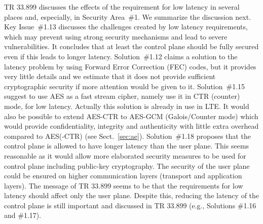 \documentclass[12pt]{llncs}
\begin{document}
TR 33.899 discusses the effects of the requirement for low latency in several places and, especially, in Security Area~\#1. We summarize the discussion next. 
Key Issue~\#1.13 discusses the challenges created by low latency requirements, which  may prevent using strong security mechanisms and lead to severe vulnerabilities. It concludes that at least the control plane should be fully secured even if this leads to longer latency. 
Solution~\#1.12 claims a solution to the latency problem by using Forward Error Correction (FEC) codes, but it provides very little details and we estimate that it does not provide sufficient cryptographic security if more attention would be given to it. 
Solution~\#1.15 suggest to use AES as a fast stream cipher, namely use it in CTR (counter) mode, for low latency. Actually this solution is already in use in LTE.
It would also be possible to extend AES-CTR to AES-GCM (Galois/Counter mode) which would provide confidentiality, integrity and authenticity with little extra overhead compared to AES(-CTR) (see Sect.~\ref{sec:ae}).
Solution~\#1.18 proposes that the control plane is allowed to have longer latency than the user plane. This seems reasonable as it would allow more elaborated security measures to be used for control plane including public-key cryptography. The security of the user plane could be ensured on higher communication layers (transport and application layers). %
The message of TR 33.899 seems to be that the requirements for low latency should affect only the user plane. Despite this, reducing the latency of the control plane is still important and discussed in TR 33.899 (e.g., Solutions \#1.16 and \#1.17).
\end{document}
